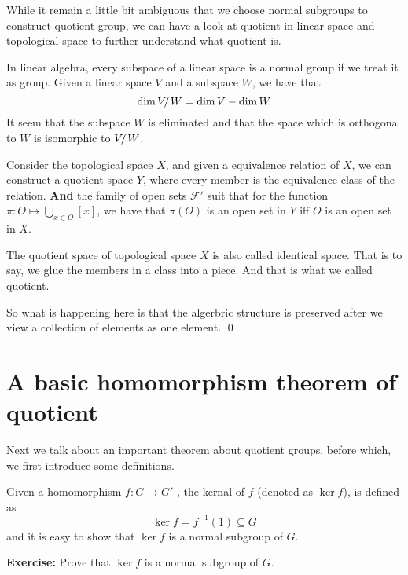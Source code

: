 \documentclass[../main.tex]{subfiles}
\begin{document}
\begin{exam}
While it remain a little bit ambiguous that we choose normal subgroups to construct 
quotient group, we can have a look at quotient in linear space and topological space 
to further understand what quotient is.

In linear algebra, every subspace of a linear space is a normal group if we treat it as group. 
Given a linear space \(V\) and a subspace \(W\), we have that 
\[
\dim V \kern -2pt/\kern 1pt W = \dim V - \dim W
\]
It seem that the subspace \(W\) is eliminated and that the space which is orthogonal to \(W\) is isomorphic to 
\(V \kern -2pt/\kern 1pt W \). 

Consider the topological space \(X\), and given a equivalence relation of \(X\), we can construct a quotient space 
	\(Y\), where every member is the equivalence class of the relation. \textbf{And} the family of open sets \(\mathscr F'\) suit that for the function \(\pi \colon O \mapsto \bigcup_{ x \in O} [x]\), 
	we have that \(\pi (O)\) is an open set in \(Y\) iff \(O\) is an open set in \(X\). 

	The quotient space of topological space \(X\) is also called identical space. That is to say, we glue the 
	members in a class into a piece. And that is what we called quotient.  

	So what is happening here is that the algerbric structure is preserved after we view a collection of elements as one 
	element. 
	\qed
\end{exam}

\section{A basic homomorphism theorem of quotient}
\label{sec:A basic homomorphism theorem of quotient}
Next we talk about an important theorem about quotient groups, before which, we first introduce some 
definitions.
\begin{definition}[kernal]\label{def:kernal}
	Given a homomorphism \(f \colon G \to G '\) , the kernal of \(f\) (denoted as \(\ker f\)), is defined as 
	\[
		\ker f = f ^{-1} (1) \subseteq G
	\]
	and it is easy to show that \(\ker f\) is a normal subgroup of \(G\).
\end{definition}
\noindent \textbf{Exercise:} Prove that \(\ker f\) is a normal subgroup of \(G\).
\medskip
\end{document}

